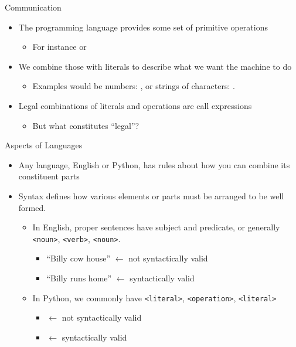 \documentclass[pdf, aspectratio=169, 12pt]{beamer}
\begin{document}
\begin{frame}{Communication}
	\begin{itemize}
		\item The programming language provides some set of primitive operations
			\begin{itemize}
				\item For instance \pyi{*} or \pyi{+}
			\end{itemize}
		\item We combine those with \alert{literals} to describe what we want the machine to do
			\begin{itemize}
				\item Examples would be numbers: , or strings of characters: .
			\end{itemize}
		\item Legal combinations of literals and operations are call \alert{expressions}
			\begin{itemize}
				\item But what constitutes ``legal''?
			\end{itemize}
	\end{itemize}
\end{frame}

\begin{frame}{Aspects of Languages}
	\begin{itemize}
		\item Any language, English or Python, has rules about how you can combine its constituent parts
		\item \alert{Syntax} defines how various elements or parts must be arranged to be well formed.
			\begin{itemize}
				\item In English, proper sentences have subject and predicate, or generally {\tt<noun>}, {\tt<verb>}, {\tt<noun>}.
					\begin{itemize}
						\item ``Billy cow house'' $\leftarrow$ not syntactically valid
						\item ``Billy runs home'' $\leftarrow$ syntactically valid
					\end{itemize}
				\item In Python, we commonly have {\tt<literal>}, {\tt<operation>}, {\tt<literal>}
					\begin{itemize}
						\item {} $\leftarrow$ not syntactically valid
						\item {} $\leftarrow$ syntactically valid
					\end{itemize}
			\end{itemize}
	\end{itemize}
\end{frame}
\end{document}
